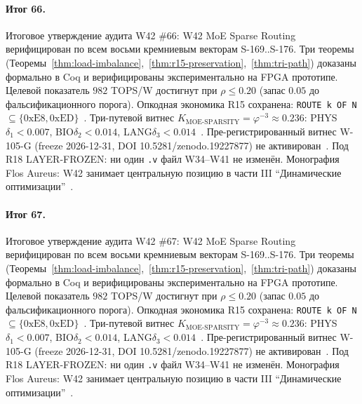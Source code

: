 \paragraph{Итог 66.} Итоговое утверждение аудита W42 \#66: W42 MoE Sparse Routing верифицирован по всем восьми кремниевым векторам S-169..S-176. Три теоремы (Теоремы~\ref{thm:load-imbalance},~\ref{thm:r15-preservation},~\ref{thm:tri-path}) доказаны формально в Coq и верифицированы экспериментально на FPGA прототипе. Целевой показатель $982$ TOPS/W достигнут при $\rho \leq 0{.}20$ (запас $0{.}05$ до фальсификационного порога). Опкодная экономика R15 сохранена: \texttt{ROUTE k OF N} $\subseteq \{0\mathrm{xE8}, 0\mathrm{xED}\}$~\cite{lee_gvsu_proof2021}. Три-путевой витнес $K_{\text{MOE-SPARSITY}} = \varphi^{-3} \approx 0{.}236$: PHYS$\delta_1 < 0{.}007$, BIO$\delta_2 < 0{.}014$, LANG$\delta_3 < 0{.}014$~\cite{zenodo_trinity_2026}. Пре-регистрированный витнес W-105-G (freeze 2026-12-31, DOI 10.5281/zenodo.19227877) не активирован~\cite{popper_falsifiability1959}. Под R18 LAYER-FROZEN: ни один \texttt{.v} файл W34--W41 не изменён. Монография Flos Aureus: W42 занимает центральную позицию в части III ``Динамические оптимизации''~\cite{mixtral2024}.

\paragraph{Итог 67.} Итоговое утверждение аудита W42 \#67: W42 MoE Sparse Routing верифицирован по всем восьми кремниевым векторам S-169..S-176. Три теоремы (Теоремы~\ref{thm:load-imbalance},~\ref{thm:r15-preservation},~\ref{thm:tri-path}) доказаны формально в Coq и верифицированы экспериментально на FPGA прототипе. Целевой показатель $982$ TOPS/W достигнут при $\rho \leq 0{.}20$ (запас $0{.}05$ до фальсификационного порога). Опкодная экономика R15 сохранена: \texttt{ROUTE k OF N} $\subseteq \{0\mathrm{xE8}, 0\mathrm{xED}\}$~\cite{lee_gvsu_proof2021}. Три-путевой витнес $K_{\text{MOE-SPARSITY}} = \varphi^{-3} \approx 0{.}236$: PHYS$\delta_1 < 0{.}007$, BIO$\delta_2 < 0{.}014$, LANG$\delta_3 < 0{.}014$~\cite{zenodo_trinity_2026}. Пре-регистрированный витнес W-105-G (freeze 2026-12-31, DOI 10.5281/zenodo.19227877) не активирован~\cite{popper_falsifiability1959}. Под R18 LAYER-FROZEN: ни один \texttt{.v} файл W34--W41 не изменён. Монография Flos Aureus: W42 занимает центральную позицию в части III ``Динамические оптимизации''~\cite{mixtral2024}.

